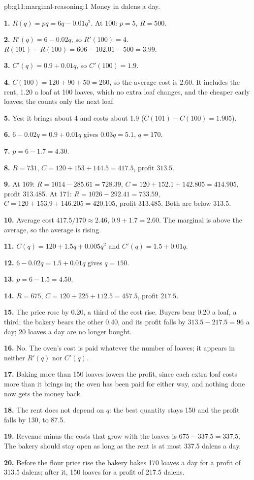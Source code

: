 \begin{solution}{pb:g11:marginal-reasoning:1}
Money in dalens a day.

\textbf{1.} $R(q) = pq = 6q - 0.01q^2$. At 100: $p = 5$, $R = 500$.

\textbf{2.} $R'(q) = 6 - 0.02q$, so $R'(100) = 4$. $R(101) - R(100) = 606 - 102.01 - 500 = 3.99$.

\textbf{3.} $C'(q) = 0.9 + 0.01q$, so $C'(100) = 1.9$.

\textbf{4.} $C(100) = 120 + 90 + 50 = 260$, so the average cost is 2.60. It includes the rent, 1.20 a loaf at 100 loaves, which no extra loaf changes, and the cheaper early
loaves; the  counts only the next loaf.

\textbf{5.} Yes: it brings about 4 and costs about 1.9 ($C(101) - C(100) = 1.905$).

\textbf{6.} $6 - 0.02q = 0.9 + 0.01q$ gives $0.03q = 5.1$, $q = 170$.

\textbf{7.} $p = 6 - 1.7 = 4.30$.

\textbf{8.} $R = 731$, $C = 120 + 153 + 144.5 = 417.5$, profit $313.5$.

\textbf{9.} At 169: $R = 1014 - 285.61 = 728.39$, $C = 120 + 152.1 + 142.805 = 414.905$, profit 313.485. At 171: $R = 1026 - 292.41 = 733.59$, $C = 120 + 153.9 + 146.205 = 420.105$,
profit 313.485. Both are below 313.5.

\textbf{10.} Average cost $417.5/170 \approx 2.46$,  $0.9 + 1.7 = 2.60$. The marginal is above the average, so the average is rising.

\textbf{11.} $C(q) = 120 + 1.5q + 0.005q^2$ and $C'(q) = 1.5 + 0.01q$.

\textbf{12.} $6 - 0.02q = 1.5 + 0.01q$ gives $q = 150$.

\textbf{13.} $p = 6 - 1.5 = 4.50$.

\textbf{14.} $R = 675$, $C = 120 + 225 + 112.5 = 457.5$, profit $217.5$.

\textbf{15.} The price rose by 0.20, a third of the cost rise. Buyers bear 0.20 a loaf, a third; the bakery bears the other 0.40, and its profit falls by
$313.5 - 217.5 = 96$ a day; 20 loaves a day are no longer bought.

\textbf{16.} No. The oven's cost is paid whatever the number of loaves; it appears in neither $R'(q)$ nor $C'(q)$.

\textbf{17.} Baking more than 150 loaves lowers the profit, since each extra loaf costs more than it brings in; the oven has been paid for either way, and nothing done now
gets the money back.

\textbf{18.} The rent does not depend on $q$: the best quantity stays 150 and the profit falls by 130, to 87.5.

\textbf{19.} Revenue minus the costs that grow with the loaves is $675 - 337.5 = 337.5$. The bakery should stay open as long as the rent is at most 337.5 dalens a day.

\textbf{20.} Before the flour price rise the bakery bakes 170 loaves a day for a profit of 313.5 dalens; after it, 150 loaves for a profit of 217.5 dalens.
\end{solution}
